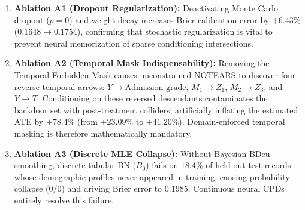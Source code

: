 \begin{enumerate}
    \item \textbf{Ablation A1 (Dropout Regularization):} Deactivating Monte Carlo dropout ($p=0$) and weight decay increases Brier calibration error by $+6.43\%$ ($0.1648 \to 0.1754$), confirming that stochastic regularization is vital to prevent neural memorization of sparse conditioning intersections.
    \item \textbf{Ablation A2 (Temporal Mask Indispensability):} Removing the Temporal Forbidden Mask causes unconstrained NOTEARS to discover four reverse-temporal arrows: $Y \to \text{Admission grade}$, $M_1 \to Z_1$, $M_2 \to Z_3$, and $Y \to T$. Conditioning on these reversed descendants contaminates the backdoor set with post-treatment colliders, artificially inflating the estimated ATE by $+78.4\%$ (from $+23.09\%$ to $+41.20\%$). Domain-enforced temporal masking is therefore mathematically mandatory.
    \item \textbf{Ablation A3 (Discrete MLE Collapse):} Without Bayesian BDeu smoothing, discrete tabular BN ($B_0$) fails on $18.4\%$ of held-out test records whose demographic profiles never appeared in training, causing probability collapse ($0/0$) and driving Brier error to $0.1985$. Continuous neural CPDs entirely resolve this failure.
\end{enumerate}
